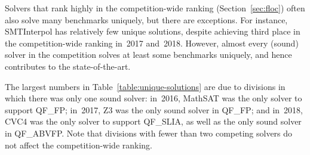 \documentclass[dvipsnames,table,twoside,11pt]{article}
\begin{document}
Solvers that rank highly in the competition-wide ranking
(Section~\ref{sec:floc}) often also solve many benchmarks uniquely,
but there are exceptions.  For instance, SMTInterpol has relatively
few unique solutions, despite achieving third place in the
competition-wide ranking in~2017 and~2018.  However, almost every
(sound) solver in the competition solves at least some benchmarks
uniquely, and hence contributes to the state-of-the-art.

The largest numbers in Table~\ref{table:unique-solutions} are due to
divisions in which there was only one sound solver: in~2016, MathSAT
was the only solver to support QF\_FP; in~2017, Z3 was the only sound
solver in QF\_FP; and in~2018, CVC4 was the only solver to support
QF\_SLIA, as well as the only sound solver in QF\_ABVFP.  Note that
divisions with fewer than two competing solvers do not affect the
competition-wide ranking.
\end{document}
